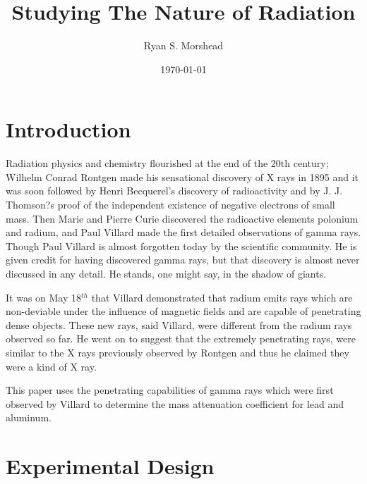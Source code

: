 \documentclass[prb,preprint]{revtex4-1}
\begin{document}
\title{Studying The Nature of Radiation}

\author{Ryan S. Morshead}


\date{\today}

\begin{abstract}




\end{abstract}


\maketitle


\section{Introduction}

Radiation physics and chemistry flourished at the end of the 20th century; Wilhelm Conrad Rontgen made his sensational discovery of X rays in 1895 and it was soon followed by Henri Becquerel's discovery of radioactivity and by J. J. Thomson?s proof of the independent existence of negative electrons of small mass. Then Marie and Pierre Curie discovered the radioactive elements polonium and radium, and Paul Villard made the first detailed observations of gamma rays. Though Paul Villard is almost forgotten today by the scientific community. He is given credit for having discovered gamma rays, but that discovery is almost never discussed in any detail. He stands, one might say, in the shadow of giants.

It was on May 18$^{th}$ that Villard demonstrated that radium emits rays which are non-deviable under the influence of magnetic fields and are capable of penetrating dense objects. These new rays, said Villard, were different from the radium rays observed so far. He went on to suggest that the extremely penetrating rays, were similar to the X rays previously observed by Rontgen and thus he claimed they were a kind of X ray.

This paper uses the penetrating capabilities of gamma rays which were first observed by Villard to determine the mass attenuation coefficient for lead and aluminum.



\section{Experimental Design}
\end{document}
